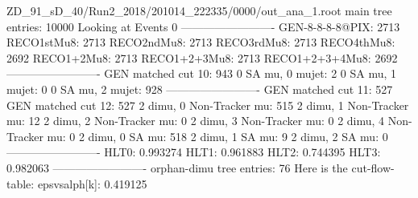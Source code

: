 ZD_91_sD_40/Run2_2018/201014_222335/0000/out_ana_1.root
main tree entries: 10000
Looking at Events 0
-------------------------
GEN-8-8-8-8@PIX: 2713
RECO1stMu8: 2713
RECO2ndMu8: 2713
RECO3rdMu8: 2713
RECO4thMu8: 2692
RECO1+2Mu8: 2713
RECO1+2+3Mu8: 2713
RECO1+2+3+4Mu8: 2692
-------------------------
GEN matched cut 10: 943
0 SA mu, 0 mujet: 2
0 SA mu, 1 mujet: 0
0 SA mu, 2 mujet: 928
-------------------------
GEN matched cut 11: 527
GEN matched cut 12: 527
2 dimu, 0 Non-Tracker mu: 515
2 dimu, 1 Non-Tracker mu: 12
2 dimu, 2 Non-Tracker mu: 0
2 dimu, 3 Non-Tracker mu: 0
2 dimu, 4 Non-Tracker mu: 0
2 dimu, 0 SA mu: 518
2 dimu, 1 SA mu: 9
2 dimu, 2 SA mu: 0
-------------------------
HLT0: 0.993274
HLT1: 0.961883
HLT2: 0.744395
HLT3: 0.982063
-------------------------
orphan-dimu tree entries: 76
Here is the cut-flow-table:
epsvsalph[k]: 0.419125
        
